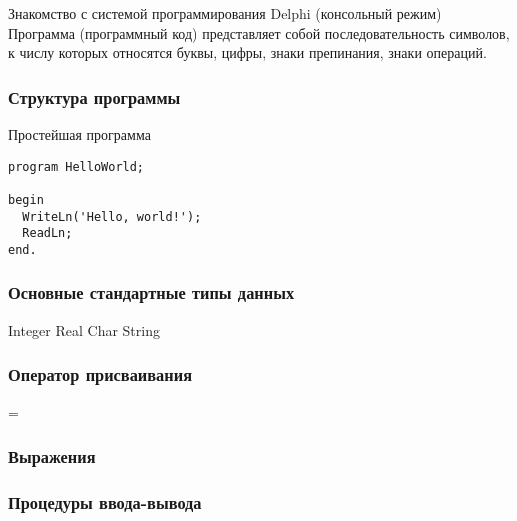 \documentclass[12pt,a4paper]{report}
\begin{document}
\parindent=1cm
\pagestyle{empty}

\lstset{ language=Pascal, basicstyle=\small\ttfamily, numbers=left, numberstyle=\tiny, stepnumber=1, numbersep=5pt, extendedchars=\true, showstringspaces=false, breakatwhitespace=true, frame=single, keepspaces=true }
\clearpage

Знакомство с системой программирования Delphi (консольный режим)
Программа (программный код) представляет собой последовательность символов, к числу которых относятся буквы, цифры, знаки препинания, знаки операций.


\subsubsection*{Структура программы}
Простейшая программа
\begin{verbatim}
program HelloWorld;

begin
  WriteLn('Hello, world!');
  ReadLn;
end.
\end{verbatim}


\subsubsection*{Основные стандартные типы данных}
Integer
Real
Char
String

\subsubsection*{Оператор присваивания}
=

\subsubsection*{Выражения}

\subsubsection*{Процедуры ввода-вывода}



\clearpage
\end{document}
